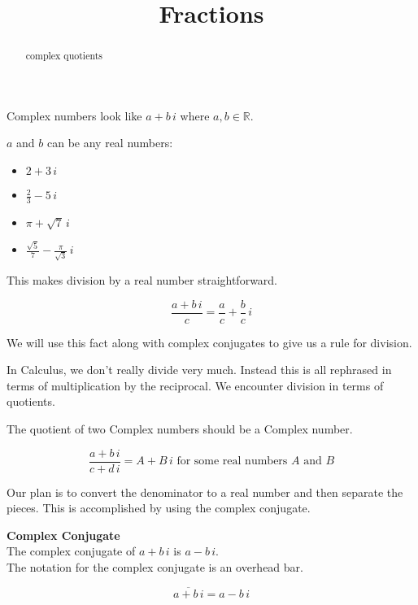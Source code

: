 \documentclass{ximera}
\title{Fractions}
\begin{document}
\begin{abstract}
complex quotients
\end{abstract}
\maketitle




Complex numbers look like $a + b \, i$ where $a, b \in \mathbb{R}$.


$a$ and $b$ can be any real numbers:



\begin{itemize}
	\item $2 + 3 \, i$
	\item $\frac{2}{3} - 5 \, i$
	\item $\pi + \sqrt{7} \, i$
	\item $\frac{\sqrt{5}}{7} - \frac{\pi}{\sqrt{3}} \, i$
\end{itemize}



This makes division by a real number straightforward.




\[
\frac{a + b \, i}{c} = \frac{a}{c} + \frac{b}{c} \, i
\]





We will use this fact along with complex conjugates to give us a rule for division.



In Calculus, we don't really divide very much.  Instead this is all rephrased in terms of multiplication by the reciprocal.  We encounter division in terms of quotients.


The quotient of two Complex numbers should be a Complex number.

\[
\frac{a + b \, i}{c + d \, i}  = A + B \, i  \text{ for some real numbers } A \text{ and } B
\]


Our plan is to convert the denominator to a real number and then separate the pieces.  This is accomplished by using the complex conjugate.

\begin{definition}  \textbf{\textcolor{green!50!black}{Complex Conjugate}} \\


The complex conjugate of $a + b \, i$ is $a - b \, i$. \\


The notation for the complex conjugate is an overhead bar.

\[
\overline{a + b \, i} = a - b \, i
\]


\end{definition}
\end{document}
